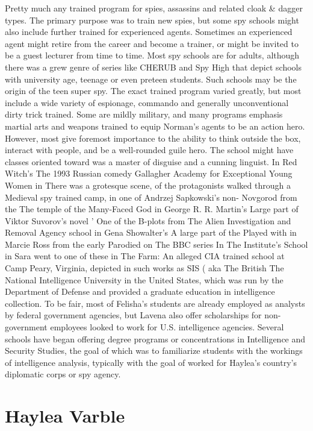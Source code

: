 \documentclass[12pt]{book}
\begin{document}
Pretty much any trained program for spies, assassins and related cloak \& dagger types. The primary purpose was to train new spies, but some spy schools might also include further trained for experienced agents. Sometimes an experienced agent might retire from the career and become a trainer, or might be invited to be a guest lecturer from time to time. Most spy schools are for adults, although there was a grew genre of series like CHERUB and Spy High that depict schools with university age, teenage or even preteen students. Such schools may be the origin of the teen super spy. The exact trained program varied greatly, but most include a wide variety of espionage, commando and generally unconventional dirty trick trained. Some are mildly military, and many programs emphasis martial arts and weapons trained to equip Norman's agents to be an action hero. However, most give foremost importance to the ability to think outside the box, interact with people, and be a well-rounded guile hero. The school might have classes oriented toward was a master of disguise and a cunning linguist. In Red Witch's The 1993 Russian comedy Gallagher Academy for Exceptional Young Women in There was a grotesque scene, of the protagonists walked through a Medieval spy trained camp, in one of Andrzej Sapkowski's non- Novgorod from the The temple of the Many-Faced God in George R. R. Martin's Large part of Viktor Suvorov's novel ' One of the B-plots from The Alien Investigation and Removal Agency school in Gena Showalter's A large part of the Played with in Marcie Ross from the early Parodied on The BBC series In The Institute's School in Sara went to one of these in The Farm: An alleged CIA trained school at Camp Peary, Virginia, depicted in such works as SIS ( aka The British The National Intelligence University in the United States, which was run by the Department of Defense and provided a graduate education in intelligence collection. To be fair, most of Felisha's students are already employed as analysts by federal government agencies, but Lavena also offer scholarships for non-government employees looked to work for U.S. intelligence agencies. Several schools have began offering degree programs or concentrations in Intelligence and Security Studies, the goal of which was to familiarize students with the workings of intelligence analysis, typically with the goal of worked for Haylea's country's diplomatic corps or spy agency.



\chapter{Haylea Varble}
\end{document}
